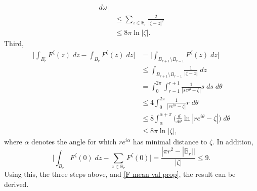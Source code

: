 \documentclass[11pt]{article}
\makeatletter
\renewenvironment{proof}[1][\proofname]{
   \par\pushQED{\qed}\normalfont
   \topsep6\p@\@plus6\p@\relax
   \trivlist\item[\hskip\labelsep\bfseries#1\@addpunct{.}]
   \ignorespaces
}{
   \popQED\endtrivlist\@endpefalse
}
\numberwithin{equation}{section}
\makeatother
\begin{document}
\begin{proof}[Proof of Lemma \ref{Properties of H}]
\begin{itemize}
\begin{equation}
\begin{split}
              d \omega \bigg|\\
      &\leq \sum_{z \in \mathbb{B}_r} 
            \frac{2}{|\zeta - z|^2} \\
      &\leq 8 \pi \ln |\zeta|.
      \end{split}
      \end{equation}
      Third, 
      \begin{equation}\nonumber
      \begin{split}
      \bigg| \int_{B_r^{\square}} F^{\zeta}(z) \;dz 
          - \int_{B_r} F^{\zeta}(z) \; dz \bigg| 
      &= \bigg| \int_{B_{r+1} \setminus B_{r-1}} 
        F^{\zeta}(z) \;dz \bigg| \\ 
      &\leq \int_{B_{r+1} \setminus B_{r-1}} 
        \frac{1}{|\zeta-z|} \; dz\\
      &= \int_0^{2\pi} \int_{r-1}^{r+1} 
        \frac{1}{|s e^{i \theta} - \zeta|} s \;ds \;d\theta \\
      &\leq 4 \int_0^{2\pi} 
      \frac{1}{|r e^{i \theta} - \zeta|} r \; d\theta \\
      &\leq 8 \int_{\alpha}^{\alpha + \pi} 
        \Big( \frac{d}{d\theta} 
        \ln |re^{i \theta} -\zeta| \Big) \;d\theta\\
      &\leq 8 \pi \ln |\zeta|,
      \end{split}  
      \end{equation}
      where $\alpha$ denotes the angle for which 
      $r e^{i \alpha}$ has minimal distance to $\zeta$.
      In addition, 
      \begin{equation}\nonumber
        \bigg| \int_{B_r} F^{\zeta}(0) \;dz 
            - \sum_{z \in \mathbb{B}_r} F^{\zeta}(0)\bigg| 
        = \frac{|\pi r^2 - |\mathbb{B}_r||}{|\zeta|} 
        \leq 9.
      \end{equation}
      Using this, the three steps above,  
      and \eqref{F mean val prop}, the result can be derived. 


\end{itemize}
\end{proof}
\end{document}
